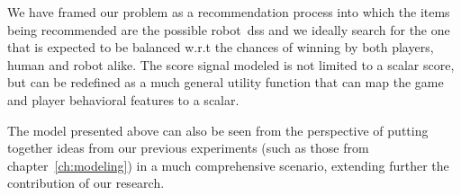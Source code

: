 We have framed our problem as a recommendation process into which the items being recommended are the possible robot~\glsdesc{ds}s and we ideally search for the one that is expected to be balanced w.r.t the chances of winning by both players, \ie human and robot alike. The score signal modeled is not limited to a scalar score, but can be redefined as a much general utility function that can map the game and player behavioral features to a scalar. 

The model presented above can also be seen from the perspective of putting together ideas from our previous experiments (such as those from chapter~\ref{ch:modeling}) in a much comprehensive scenario, extending further the contribution of our research.
